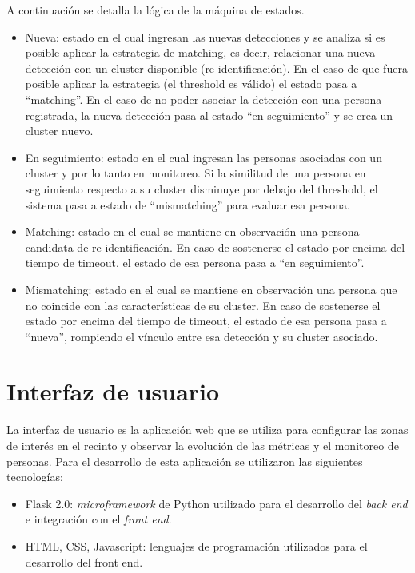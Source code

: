 A continuación se detalla la lógica de la máquina de estados.
\begin{itemize}
\item Nueva: estado en el cual ingresan las nuevas detecciones y se analiza si es posible aplicar la estrategia de matching, es decir, relacionar una nueva detección con un cluster disponible (re-identificación). En el caso de que fuera posible aplicar la estrategia (el threshold es válido) el estado pasa a ``matching''. En el caso de no poder asociar la detección con una persona registrada, la nueva detección pasa al estado ``en seguimiento'' y se crea un cluster nuevo.
\item En seguimiento: estado en el cual ingresan las personas asociadas con un cluster y por lo tanto en monitoreo. Si la similitud de una persona en seguimiento respecto a su cluster disminuye por debajo del threshold, el sistema pasa a estado de ``mismatching'' para evaluar esa persona.
\item Matching: estado en el cual se mantiene en observación una persona candidata de re-identificación. En caso de sostenerse el estado por encima del tiempo de timeout, el estado de esa persona pasa a ``en seguimiento''.
\item Mismatching: estado en el cual se mantiene en observación una persona que no coincide con las características de su cluster. En caso de sostenerse el estado por encima del tiempo de timeout, el estado de esa persona pasa a ``nueva'', rompiendo el vínculo entre esa detección y su cluster asociado.
\end{itemize}

\newpage


\section{Interfaz de usuario}
\label{sec:gui}

La interfaz de usuario es la aplicación web que se utiliza para configurar las zonas de interés en el recinto y observar la evolución de las métricas y el monitoreo de personas. Para el desarrollo de esta aplicación se utilizaron las siguientes tecnologías:
\begin{itemize}
\item Flask 2.0: \textit{microframework} \citep{FLASK} de Python utilizado para el desarrollo del \textit{back end} e integración con el \textit{front end}.
\item HTML, CSS, Javascript: lenguajes de programación utilizados para el desarrollo del front end.
\end{itemize}

